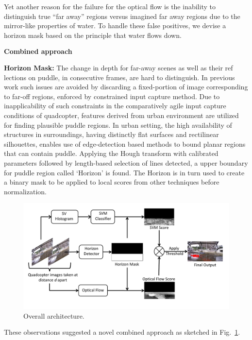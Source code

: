 \documentclass[11pt]{article}
\begin{document}
Yet another reason for the failure for the optical flow is the
inability to distinguish true ``far away'' regions versus imagined far
away regions due to the mirror-like properties of water.  To handle
these false positives, we devise a horizon mask based on the principle
that water flows down.

\textbf{Combined approach}

\textbf{Horizon Mask:} The change in depth for far-away scenes as well
as their ref	lections on puddle, in consecutive frames, are hard to
distinguish. In previous work \cite{rankin11} such issues are avoided
by discarding a fixed-portion of image corresponding to far-off
regions, enforced by constrained input capture method. Due to
inapplicability of such constraints in the comparatively agile input
capture conditions of quadcopter, features derived from urban
environment are utilized for finding plausible puddle regions. In
urban setting, the high availability of structures in surroundings,
having distinctly flat surfaces and rectilinear silhouettes, enables
use of edge-detection based methods to bound planar regions that can
contain puddle. Applying the Hough transform with calibrated
parameters followed by length-based selection of lines detected, a
upper boundary for puddle region called `Horizon' is found. The
Horizon is in turn used to create a binary mask to be applied to local
scores from other techniques before normalization.

\begin{figure}[h!]
  \centering
  \includegraphics[width=\textwidth]{stagnantWater/figures/overall_workflow.pdf}
  \caption{Overall architecture.}
  \label{fig:workflow}
\end{figure}

These observations suggested a novel combined approach as sketched
in Fig.~\ref{fig:workflow}.
\end{document}
